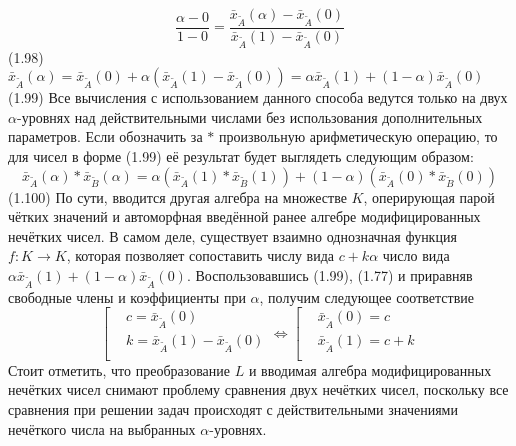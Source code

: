 	\[\frac{\alpha -0}{1-0}=\frac{{{{\bar{x}}}_{{\tilde{A}}}}\left( \alpha  \right)-{{{\bar{x}}}_{{\tilde{A}}}}\left( 0 \right)}{{{{\bar{x}}}_{{\tilde{A}}}}\left( 1 \right)-{{{\bar{x}}}_{{\tilde{A}}}}\left( 0 \right)}\] 	(1.98)
	${{\bar{x}}_{{\tilde{A}}}}\left( \alpha  \right)={{\bar{x}}_{{\tilde{A}}}}\left( 0 \right)+\alpha \left( {{{\bar{x}}}_{{\tilde{A}}}}\left( 1 \right)-{{{\bar{x}}}_{{\tilde{A}}}}\left( 0 \right) \right)=\alpha {{\bar{x}}_{{\tilde{A}}}}\left( 1 \right)+\left( 1-\alpha  \right){{\bar{x}}_{{\tilde{A}}}}\left( 0 \right)$ 	(1.99)
Все вычисления с использованием данного способа ведутся только на двух $\alpha $-уровнях над действительными числами без использования дополнительных параметров. Если обозначить за $*$ произвольную арифметическую операцию, то для чисел в форме (1.99) её результат будет выглядеть следующим образом:
	\[{{\bar{x}}_{{\tilde{A}}}}\left( \alpha  \right)*{{\bar{x}}_{{\tilde{B}}}}\left( \alpha  \right)=\alpha \left( {{{\bar{x}}}_{{\tilde{A}}}}\left( 1 \right)*{{{\bar{x}}}_{{\tilde{B}}}}\left( 1 \right) \right)+\left( 1-\alpha  \right)\left( {{{\bar{x}}}_{{\tilde{A}}}}\left( 0 \right)*{{{\bar{x}}}_{{\tilde{B}}}}\left( 0 \right) \right)\] 	(1.100)
По сути, вводится другая алгебра на множестве $K$, оперирующая парой чётких значений и автоморфная введённой ранее алгебре модифицированных нечётких чисел. В самом деле, существует взаимно однозначная функция $f:K\to K$, которая позволяет сопоставить числу вида $c+k\alpha $ число вида $\alpha {{\bar{x}}_{{\tilde{A}}}}\left( 1 \right)+\left( 1-\alpha  \right){{\bar{x}}_{{\tilde{A}}}}\left( 0 \right)$. Воспользовавшись (1.99), (1.77) и приравняв свободные члены и коэффициенты при $\alpha$, получим следующее соответствие
	\[\left[ \begin{aligned}
  & c={{{\bar{x}}}_{{\tilde{A}}}}\left( 0 \right) \\ 
 & k={{{\bar{x}}}_{{\tilde{A}}}}\left( 1 \right)-{{{\bar{x}}}_{{\tilde{A}}}}\left( 0 \right) \\ 
\end{aligned} \right.\Leftrightarrow \left[ \begin{aligned}
  & {{{\bar{x}}}_{{\tilde{A}}}}\left( 0 \right)=c \\ 
 & {{{\bar{x}}}_{{\tilde{A}}}}\left( 1 \right)=c+k \\ 
\end{aligned} \right.\] 
Стоит отметить, что преобразование $L$ и вводимая алгебра модифицированных нечётких чисел снимают проблему сравнения двух нечётких чисел, поскольку все сравнения при решении задач происходят с действительными значениями нечёткого числа на выбранных $\alpha$-уровнях.

